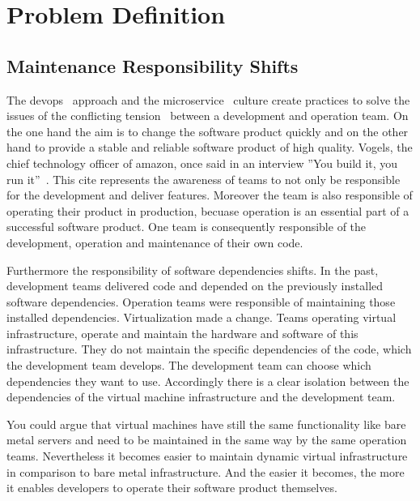 \chapter{Problem Definition}
\label{chap:problem}

\section{Maintenance Responsibility Shifts}

The devops~\cite{devops_definition} approach and the
microservice~\cite{microservices_fowler} culture create practices to solve the issues of
the conflicting tension~\cite{sre_intro} between a development and operation team. On the
one hand the aim is to change the software product quickly and on the other hand to
provide a stable and reliable software product of high quality. Vogels, the chief
technology officer of amazon, once said in an interview ”You build it, you run
it”~\cite{build_run}. This cite represents the awareness of teams to not only be
responsible for the development and deliver features. Moreover the team is also
responsible of operating their product in production, becuase operation is an essential
part of a successful software product. One team is consequently responsible of the
development, operation and maintenance of their own code.

Furthermore the responsibility of software dependencies shifts. In the past, development
teams delivered code and depended on the previously installed software
dependencies. Operation teams were responsible of maintaining those installed
dependencies. Virtualization made a change. Teams operating virtual infrastructure,
operate and maintain the hardware and software of this infrastructure. They do not
maintain the specific dependencies of the code, which the development team develops. The
development team can choose which dependencies they want to use. Accordingly there is a
clear isolation between the dependencies of the virtual machine infrastructure and the
development team.

You could argue that virtual machines have still the same functionality like bare metal
servers and need to be maintained in the same way by the same operation
teams. Nevertheless it becomes easier to maintain dynamic virtual
infrastructure~\cite{infra_as_code_platforms} in comparison to bare metal
infrastructure. And the easier it becomes, the more it enables developers to operate their
software product themselves.

